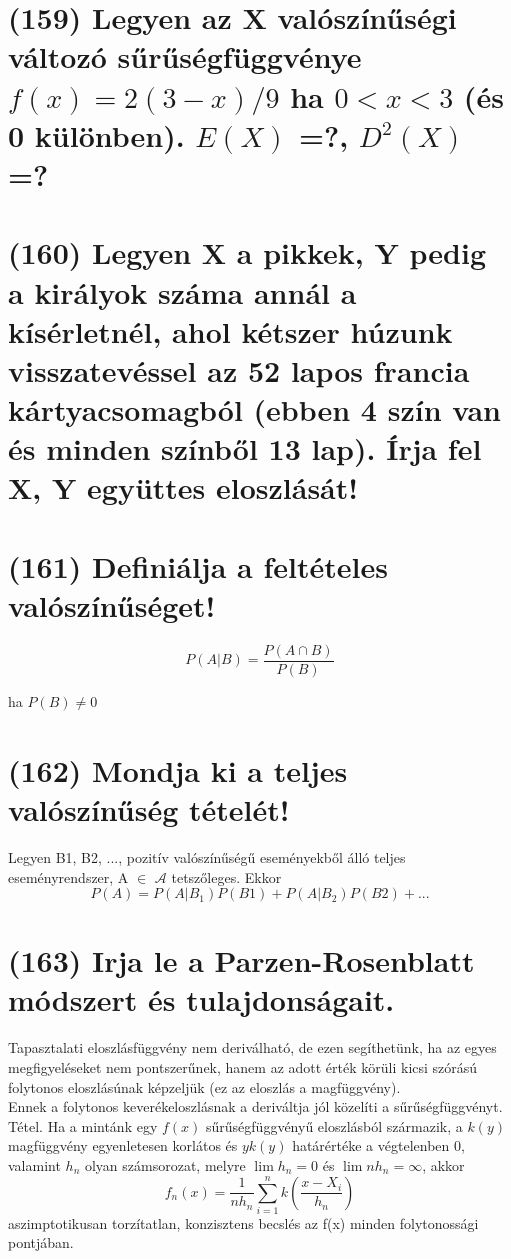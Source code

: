 \documentclass[12p]{article}
\begin{document}
\section{(159) Legyen az X valószínűségi változó sűrűségfüggvénye $f(x) = 2(3 - x)/9$ ha $0 < x < 3$ (és 0 különben). $E(X)$ =?, $D^2(X)$ =? }

\section{(160) Legyen X a pikkek, Y pedig a királyok száma annál a kísérletnél, ahol kétszer húzunk
visszatevéssel az 52 lapos francia kártyacsomagból (ebben 4 szín van és minden színből 13
lap). Írja fel X, Y együttes eloszlását!}

\section{(161) Definiálja a feltételes valószínűséget!}

$$P(A|B) = \frac{P(A \cap B)}{P(B)}$$

ha $P(B) \neq 0$

\section{(162) Mondja ki a teljes valószínűség tételét!}

Legyen B1, B2, ..., pozitív valószínűségű eseményekből álló teljes eseményrendszer, A $\in$ $\mathscr{A}$ tetszőleges. Ekkor
$$P(A) = P(A|B_1)P(B1)+P(A|B_2)P(B2)+ ...$$


\section{(163) Irja le a Parzen-Rosenblatt módszert és tulajdonságait.}

Tapasztalati eloszlásfüggvény nem deriválható, de ezen segíthetünk, ha az egyes megfigyeléseket nem pontszerűnek, hanem az adott érték körüli kicsi szórású folytonos eloszlásúnak képzeljük (ez az eloszlás a magfüggvény).\\
Ennek a folytonos keverékeloszlásnak a deriváltja jól közelíti a sűrűségfüggvényt.\\
Tétel. Ha a mintánk egy $f(x)$ sűrűségfüggvényű
eloszlásból származik, a $k(y)$ magfüggvény
egyenletesen korlátos és $yk(y)$ határértéke a
végtelenben 0, valamint $h_n$ olyan számsorozat,
melyre $\lim h_n = 0$ és $\lim nh_n = \infty$, akkor
$$f_n(x) = \frac{1}{nh_n} \sum^{n}_{i=1}k\left(\frac{x-X_i}{h_n}\right)$$ 
aszimptotikusan torzítatlan, konzisztens becslés az f(x) minden folytonossági pontjában.
\end{document}

